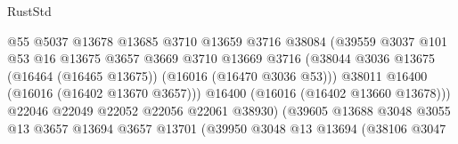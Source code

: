 \begin{lexlean}{RustStd}
\begin{coremodule}
                                            @55
                                            @5037
                                            @13678
                                            @13685
                                            @3710
                                            @13659
                                            @3716
                                            @38084
                                            (@39559
                                              @3037
                                              @101
                                              @53
                                              @16
                                              @13675
                                              @3657
                                              @3669
                                              @3710
                                              @13669
                                              @3716
                                              (@38044
                                                @3036
                                                @13675
                                                (@16464 (@16465 @13675))
                                                (@16016 (@16470 @3036 @53)))
                                              @38011
                                              @16400
                                              (@16016 (@16402 @13670 @3657)))
                                            @16400
                                            (@16016 (@16402 @13660 @13678)))
                                          @22046
                                          @22049
                                          @22052
                                          @22056
                                          @22061
                                          @38930)
                                        (@39605
                                          @13688
                                          @3048
                                          @3055
                                          @13
                                          @3657
                                          @13694
                                          @3657
                                          @13701
                                          (@39950
                                            @3048
                                            @13
                                            @13694
                                            (@38106
                                              @3047

\end{coremodule}
\end{lexlean}
